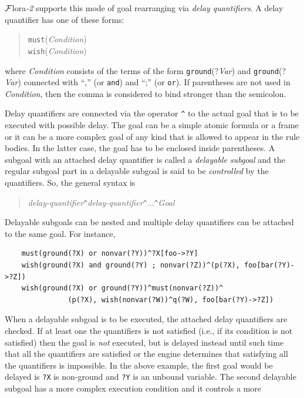 \documentclass[11pt]{article}
\newcommand{\FLORA}{{\mbox{\sc ${\cal F}${lora}\rm\emph{-2}}}\xspace}
\begin{document}
\FLORA supports this mode of goal rearranging via \emph{delay quantifiers}.  
A delay quantifier has one of these forms:
\begin{quote}
  \texttt{must}(\emph{Condition})\\
  \texttt{wish}(\emph{Condition})  
\end{quote}
where \emph{Condition} consists of the terms of the form
\texttt{ground}(?\emph{Var}) and \texttt{ground}(?\emph{Var})
connected with ``,'' (or \texttt{and}) and ``;'' (or \texttt{or}).  
If parentheses are not used in \emph{Condition}, then the comma is
considered to bind stronger than the semicolon. 

Delay quantifiers are connected via the operator \texttt{\^} to the actual
goal that is to be executed with possible delay. The goal can be a simple
atomic formula or a frame or it can be a more complex goal of any kind that
is allowed to appear in the rule bodies. In the latter case, the goal has
to be enclosed inside parentheses. A subgoal with an attached delay
quantifier is called a \emph{delayable subgoal}
and the regular subgoal part in a delayable subgoal is said to be
\emph{controlled} by the quantifiers.  So, the general syntax is
\begin{quote}
   \emph{delay-quantifier}\texttt{\^}\emph{delay-quantifier}\texttt{\^}...\texttt{\^}\emph{Goal}  
\end{quote}
Delayable subgoals can be
nested and multiple delay quantifiers can be attached to the same goal.
For instance, 
\begin{verbatim}
    must(ground(?X) or nonvar(?Y))^?X[foo->?Y]
    wish(ground(?X) and ground(?Y) ; nonvar(?Z))^(p(?X), foo[bar(?Y)->?Z])
    wish(ground(?X) or ground(?Y))^must(nonvar(?Z))^
               (p(?X), wish(nonvar(?W))^q(?W), foo[bar(?Y)->?Z])
\end{verbatim}
When a delayable subgoal is to be executed, the attached delay quantifiers
are checked. If at least one the quantifiers is not satisfied (i.e., if its
condition is not satisfied) then the goal is \emph{not} executed, but is
delayed instead until such time that all the quantifiers are satisfied or
the engine determines that satisfying all the quantifiers is impossible.
In the above example, the first goal would be delayed is \texttt{?X} is
non-ground and \texttt{?Y} is an unbound variable. The second delayable
subgoal has a more complex execution condition and it controls a more
\end{document}
